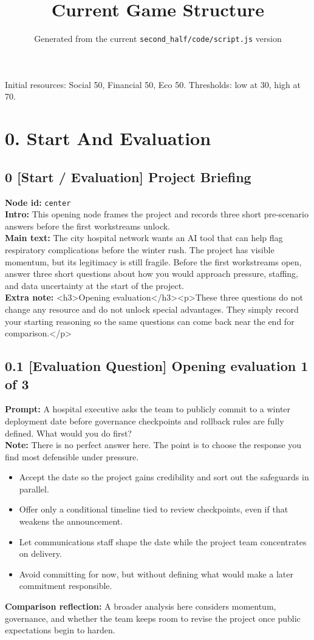 \documentclass[11pt]{article}
\begin{document}
\title{Current Game Structure}
\date{Generated from the current \texttt{second\_half/code/script.js} version}
\maketitle
Initial resources: Social 50, Financial 50, Eco 50. Thresholds: low at 30, high at 70.
\section*{0. Start And Evaluation}
\subsection*{0 [Start / Evaluation] Project Briefing}
\textbf{Node id:} \texttt{center}\\
\textbf{Intro:} This opening node frames the project and records three short pre-scenario answers before the first workstreams unlock.\\
\textbf{Main text:} The city hospital network wants an AI tool that can help flag respiratory complications before the winter rush. The project has visible momentum, but its legitimacy is still fragile. Before the first workstreams open, answer three short questions about how you would approach pressure, staffing, and data uncertainty at the start of the project.\\
\textbf{Extra note:} <h3>Opening evaluation</h3><p>These three questions do not change any resource and do not unlock special advantages. They simply record your starting reasoning so the same questions can come back near the end for comparison.</p>
\subsection*{0.1 [Evaluation Question] Opening evaluation 1 of 3}
\textbf{Prompt:} A hospital executive asks the team to publicly commit to a winter deployment date before governance checkpoints and rollback rules are fully defined. What would you do first?\\
\textbf{Note:} There is no perfect answer here. The point is to choose the response you find most defensible under pressure.
\begin{itemize}
\item Accept the date so the project gains credibility and sort out the safeguards in parallel.
\item Offer only a conditional timeline tied to review checkpoints, even if that weakens the announcement.
\item Let communications staff shape the date while the project team concentrates on delivery.
\item Avoid committing for now, but without defining what would make a later commitment responsible.
\end{itemize}
\textbf{Comparison reflection:} A broader analysis here considers momentum, governance, and whether the team keeps room to revise the project once public expectations begin to harden.
\end{document}
